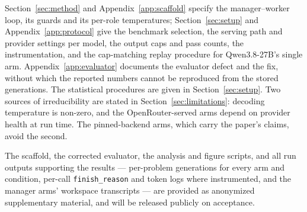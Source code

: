 \documentclass{article}
\newif\iffinalversion
\newif\ifcameraready
\begin{document}
Section~\ref{sec:method} and Appendix~\ref{app:scaffold} specify the manager--worker loop, its
guards and its per-role temperatures; Section~\ref{sec:setup} and Appendix~\ref{app:protocol} give
the benchmark selection, the serving path and provider settings per model, the output caps and
pass counts, the instrumentation, and the cap-matching replay procedure for Qwen3.8-27B's single
arm. Appendix~\ref{app:evaluator} documents the evaluator defect and the fix, without which the
reported numbers cannot be reproduced from the stored generations. The statistical procedures are
given in Section~\ref{sec:setup}. Two sources of irreducibility are stated in
Section~\ref{sec:limitations}: decoding temperature is non-zero, and the OpenRouter-served arms
depend on provider health at run time. The pinned-backend arms, which carry the paper's claims,
avoid the second.
\iffinalversion
The orchestration scaffold (both versions), the corrected LiveCodeBench evaluator, and the
analysis and figure scripts that produce every number and figure in this paper are available at
\url{https://github.com/slee-persis/GVS5H}, together with all run outputs supporting the results
--- per-problem generations for every arm and condition, per-call \texttt{finish\_reason} and
token logs where instrumented, and the manager arms' workspace transcripts (\texttt{runs/}).
\else
The scaffold, the corrected evaluator, the analysis and figure scripts, and all run outputs
supporting the results --- per-problem generations for every arm and condition, per-call
\texttt{finish\_reason} and token logs where instrumented, and the manager arms' workspace
transcripts --- are provided as anonymized supplementary material, and will be released publicly
on acceptance.
\fi

\ifcameraready
\subsubsection*{Author contributions}

\textbf{[To be completed before the camera-ready.]} For example: V.G., V.K. and A.K.\ conceived
the study and built the scaffold; X.S.\ and J.L.\ ran the experiments and analysed the data;
S.L.\ supervised the work; all authors wrote the paper.

\subsubsection*{Acknowledgments}

\textbf{[To be completed before the camera-ready --- funding sources, if any, and any non-author
help to acknowledge.]}
\fi
\end{document}
